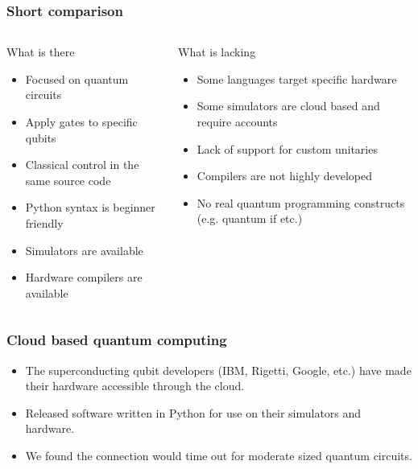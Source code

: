 \documentclass{beamer}
\begin{document}
\begin{frame}
\frametitle{Short comparison}
\begin{columns}
    \begin{block}{What is there}
    \begin{itemize}
        \item Focused on quantum circuits
        \item Apply gates to specific qubits
        \item Classical control in the same source code
        \item Python syntax is beginner friendly
        \item Simulators are available
        \item Hardware compilers are available
    \end{itemize}
    \end{block}
    \begin{block}{What is lacking}
        \begin{itemize}
            \item Some languages target specific hardware
            \item Some simulators are cloud based and require accounts
            \item Lack of support for custom unitaries
            \item Compilers are not highly developed
            \item No real quantum programming constructs (e.g. quantum if etc.)
        \end{itemize}
        \end{block}
\end{columns}
\end{frame}

\begin{frame}
  \frametitle{Cloud based quantum computing}
  \begin{itemize}
  \item The superconducting qubit developers (IBM, Rigetti, Google, etc.) have made their
      hardware accessible through the cloud. 
  \item Released software written in Python for use on their simulators and hardware.
    \item We found the connection would time out for
        moderate sized quantum circuits.
  \end{itemize}
\end{frame}
\end{document}
